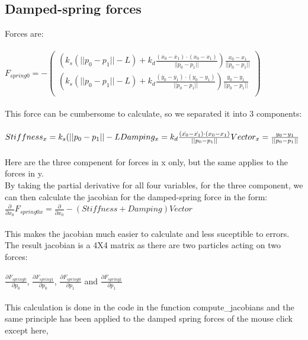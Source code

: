 \documentclass[10pt,a4paper]{report}
\begin{document}
\subsection*{Damped-spring forces}
Forces are:\\\\
$
F_{spring0}=-\begin{pmatrix}
(k_s(||p_0-p_1||-L) + k_d\frac{(\dot{x_0}-\dot{x_1}) \cdot (x_0-x_1)}{||p_0-p_1||}) \frac{x_0-x_1}{||p_0-p_1||}\\
(k_s(||p_0-p_1||-L) + k_d\frac{(\dot{y_0}-\dot{y_1}) \cdot (y_0-y_1)}{||p_0-p_1||}) \frac{y_0-y_1}{||p_0-p_1||}\\
\end{pmatrix}
$\\\\
This force can be cumbersome to calculate, so we separated it into 3 components:\\\\
$
Stiffness_x = k_s(||p_0-p_1||-L\\\\
Damping_x = k_d\frac{(\dot{x_0}-\dot{x_1}) \cdot (x_0-x_1)}{||p_0-p_1||}\\\\
Vector_x = \frac{y_0-y_1}{||p_0-p_1||}
$\\\\
Here are the three compenent for forces in x only, but the same applies to the forces in y.\\
By taking the partial derivative for all four variables, for the three component, we can then calculate the jacobian for the damped-spring force in the form:\\
$
\frac{\partial}{\partial x_0} F_{spring0 x} = \frac{\partial}{\partial x_0} -(Stiffness+Damping)Vector
$\\\\
This makes the jacobian much easier to calculate and less suceptible to errors.\\
The result jacobian is a 4X4 matrix as there are two particles acting on two forces:\\\\
$\frac{\partial F_{spring0}}{\partial p_0}$, $\frac{\partial F_{spring1}}{\partial p_0}$, $\frac{\partial F_{spring0}}{\partial p_1}$ and $\frac{\partial F_{spring1}}{\partial p_1}$\\\\
This calculation is done in the code in the function compute\_jacobians and the same principle has been applied to the damped spring forces of the mouse click except here, 
\end{document}
